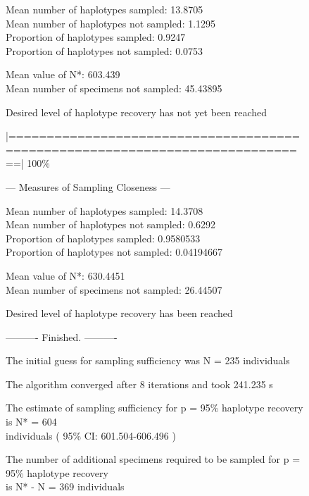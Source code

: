 \begin{figure}[H]
{\noindent Mean number of haplotypes sampled: 13.8705  \\
Mean number of haplotypes not sampled: 1.1295 \\
Proportion of haplotypes sampled: 0.9247 \\
Proportion of haplotypes not sampled: 0.0753    

\vspace{2mm} 
 
\noindent Mean value of N*: 603.439 \\
Mean number of specimens not sampled: 45.43895

\vspace{3mm}
 
\noindent Desired level of haplotype recovery has not yet been reached

\vspace{2mm}

\noindent |==============================================================================| 100\%

\vspace{3mm}

\noindent --- Measures of Sampling Closeness ---

\vspace{2mm} 
 
\noindent Mean number of haplotypes sampled: 14.3708  \\
Mean number of haplotypes not sampled: 0.6292  \\
Proportion of haplotypes sampled:  0.9580533  \\
Proportion of haplotypes not sampled: 0.04194667    

\vspace{2mm} 
 
\noindent Mean value of N*: 630.4451  \\
Mean number of specimens not sampled: 26.44507

\vspace{3mm}
 
\noindent Desired level of haplotype recovery has been reached

\vspace{2mm}

\noindent ---------- Finished. ----------
        
\noindent The initial guess for sampling sufficiency was N = 235 individuals
 
\noindent The algorithm converged after 8 iterations and took 241.235 s 
 
\noindent The estimate of sampling sufficiency for p = 95\% haplotype recovery is N* = 604 \\ individuals ( 95\% CI: 601.504-606.496 )

\noindent The number of additional specimens required to be sampled for p = 95\% haplotype recovery \\ is N* - N = 369 individuals

}

\end{figure}



